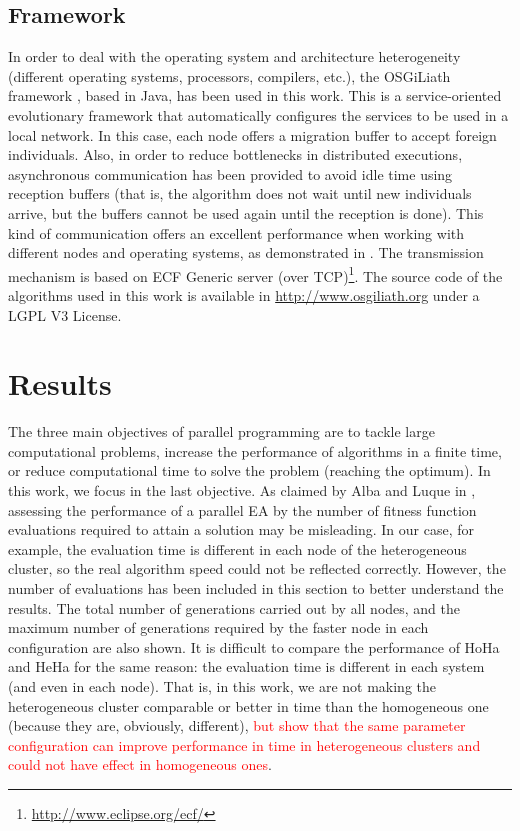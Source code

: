 \documentclass[final,1p,times]{elsarticle}
\begin{document}
\subsection{Framework}
In order to deal with the operating system and architecture heterogeneity (different operating systems, processors, compilers, etc.), the OSGiLiath framework \cite{SOASOCO}, based in Java, has been used in this work. This is a service-oriented evolutionary framework that automatically configures the services to be used in a local network. In this case, each node offers a migration buffer to accept foreign individuals. Also, in order to reduce bottlenecks in distributed executions, asynchronous communication has been provided to avoid idle time using reception buffers (that is, the algorithm does not wait until new individuals arrive, but the buffers cannot be used again until the reception is done). This kind of communication offers an excellent performance when working with different nodes and operating systems, as demonstrated in \cite{HETEROGENEOUSHARD}. The transmission mechanism is based on ECF Generic server (over TCP)\footnote{\url{http://www.eclipse.org/ecf/}}.  The source code of the algorithms used in this work is available in \url{http://www.osgiliath.org} under a LGPL V3 License. 


\section{Results}
\label{sec:results}

The three main objectives of parallel programming are to tackle large computational problems, increase the performance of algorithms in a finite time, or reduce computational time to solve the problem (reaching the optimum). In this work, we focus in the last objective.
As claimed by Alba and Luque in \cite{EVALUATIONPARALLEL}, assessing the performance of a parallel EA by the number of fitness function evaluations required to attain a solution may be misleading. In our case, for example, the evaluation time is different in each node of the heterogeneous cluster, so the real algorithm speed could not be reflected correctly. However, the number of evaluations has been included in this section to better understand the results. The total number of generations carried out by all nodes, and the maximum number of generations required by the faster node in each configuration are also shown. It is difficult to compare the performance of HoHa and HeHa for the same reason: the evaluation time is different in each system (and even in each node). That is, in this work, we are not making the heterogeneous cluster comparable or better in time than the homogeneous one (because they are, obviously, different), \textcolor{red}{but show that the same parameter configuration can improve performance in time in heterogeneous clusters and could not have effect in homogeneous ones}.
\end{document}
